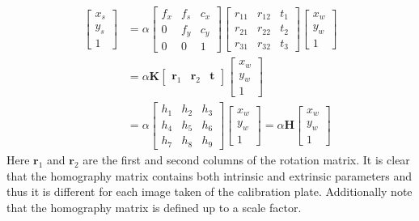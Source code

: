 \begin{align}
	\begin{bmatrix}
	x_s \\
	y_s \\
	1
	\end{bmatrix} &=
	\alpha
	\begin{bmatrix}
	f_x & f_s & c_x \\
	0 & f_y & c_y \\
	0 & 0 & 1 
	\end{bmatrix}
	\begin{bmatrix}
	r_{11} & r_{12} & t_1 \\
	r_{21} & r_{22} & t_2 \\
	r_{31} & r_{32} & t_3 
	\end{bmatrix}
	\begin{bmatrix}
	x_w \\
	y_w \\
	1
	\end{bmatrix} \\
	&= \alpha \bm{K} 
	\begin{bmatrix}
	\bm{r}_1 & \bm{r}_2 & \bm{t}
	\end{bmatrix}
	\begin{bmatrix}
	x_w \\
	y_w \\
	1
	\end{bmatrix} \\
	&= \alpha
	\begin{bmatrix}
	h_1 & h_2 & h_3 \\
	h_4 & h_5 & h_6 \\
	h_7 & h_8 & h_9
	\end{bmatrix} 
	\begin{bmatrix}
	x_w \\
	y_w \\
	1
	\end{bmatrix}
	=\alpha \bm{H} 
	\begin{bmatrix}
	x_w \\
	y_w \\
	1
	\end{bmatrix} \label{eq: homography 1}
\end{align}
Here $\bm{r}_1$ and $\bm{r}_2$ are the first and second columns of the rotation matrix. It is clear that the homography matrix contains both intrinsic and extrinsic parameters and thus it is different for each image taken of the calibration plate. Additionally note that the homography matrix is defined up to a scale factor.



